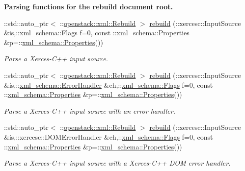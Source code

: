 \begin{Indent}{\bf Parsing functions for the rebuild document root.}
\begin{DoxyCompactItemize}
::std::auto\_\-ptr$<$ ::\hyperlink{classopenstack_1_1xml_1_1Rebuild}{openstack::xml::Rebuild} $>$ \hyperlink{namespaceopenstack_1_1xml_a662698da19264d78ed3dc631d1668581}{rebuild} (::xercesc::InputSource \&is,::\hyperlink{namespacexml__schema_affb4c227cbd9aa7453dd1dc5a1401943}{xml\_\-schema::Flags} f=0, const ::\hyperlink{namespacexml__schema_ad27ce19a7ee1d3b1064092648898f64c}{xml\_\-schema::Properties} \&p=::\hyperlink{namespacexml__schema_ad27ce19a7ee1d3b1064092648898f64c}{xml\_\-schema::Properties}())
\begin{DoxyCompactList}\small\item\em Parse a Xerces-\/C++ input source. \item\end{DoxyCompactList}\item 
::std::auto\_\-ptr$<$ ::\hyperlink{classopenstack_1_1xml_1_1Rebuild}{openstack::xml::Rebuild} $>$ \hyperlink{namespaceopenstack_1_1xml_a05e18ae51228afa49fd986f85d924441}{rebuild} (::xercesc::InputSource \&is,::\hyperlink{namespacexml__schema_ab1c9361bfd3b404eaabf0c31eded79dc}{xml\_\-schema::ErrorHandler} \&eh,::\hyperlink{namespacexml__schema_affb4c227cbd9aa7453dd1dc5a1401943}{xml\_\-schema::Flags} f=0, const ::\hyperlink{namespacexml__schema_ad27ce19a7ee1d3b1064092648898f64c}{xml\_\-schema::Properties} \&p=::\hyperlink{namespacexml__schema_ad27ce19a7ee1d3b1064092648898f64c}{xml\_\-schema::Properties}())
\begin{DoxyCompactList}\small\item\em Parse a Xerces-\/C++ input source with an error handler. \item\end{DoxyCompactList}\item 
::std::auto\_\-ptr$<$ ::\hyperlink{classopenstack_1_1xml_1_1Rebuild}{openstack::xml::Rebuild} $>$ \hyperlink{namespaceopenstack_1_1xml_a49566c472083ebcd4c25fca3c2430b1b}{rebuild} (::xercesc::InputSource \&is,::xercesc::DOMErrorHandler \&eh,::\hyperlink{namespacexml__schema_affb4c227cbd9aa7453dd1dc5a1401943}{xml\_\-schema::Flags} f=0, const ::\hyperlink{namespacexml__schema_ad27ce19a7ee1d3b1064092648898f64c}{xml\_\-schema::Properties} \&p=::\hyperlink{namespacexml__schema_ad27ce19a7ee1d3b1064092648898f64c}{xml\_\-schema::Properties}())
\begin{DoxyCompactList}\small\item\em Parse a Xerces-\/C++ input source with a Xerces-\/C++ DOM error handler. \item\end{DoxyCompactList}\item 

\end{DoxyCompactItemize}
\end{Indent}
